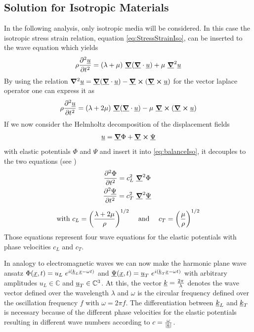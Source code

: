 
\subsection{Solution for Isotropic Materials}
\label{sec:IsoSolution}
In the following analysis, only isotropic media will be considered. In this
case the isotropic stress strain relation, equation
\ref{eq:StressStrainIso}, can be inserted to the wave equation which
yields
\begin{equation}
    \rho \ddiff{\uline{u}}{t} = (\lambda + \mu)\ \uline{\gradient}
    (\uline{\gradient}\cdot \uline{u}) + \mu\ \uline{\gradient}^2 \uline{u}
\end{equation}
By using the relation $\gradient^2 \uline u = \uline{\gradient}
    (\uline{\gradient}\cdot \uline{u}) - \uline{\gradient}
    \cross(\uline{\gradient} \cross \uline{u})$ for the vector laplace operator
one can express it as
\begin{equation} \label{eq:balanceIso}
    \rho \ddiff{\uline{u}}{t} = (\lambda + 2\mu)\ \uline{\gradient}
    (\uline{\gradient}\cdot \uline{u})- \mu\ \uline{\grad }
    \cross (\uline{\gradient}\cross \uline{u})
\end{equation}
If we now consider the Helmholtz decomposition of the displacement fields
\begin{equation} \label{eq:Helmholtz}
    \uline{u} = \uline{\gradient}\Phi + \uline{\gradient}\cross \uline{\Psi}
\end{equation}
with elastic potentials $\Phi$ and $\Psi$ and insert it into
\ref{eq:balanceIso},
it decouples to the two equations (see \cite{BedfordElasticWaves})
\begin{align}
    \ddiff{\Phi}{t} = c_L^2\
     & \uline{\gradient}^2\Phi         \\
    \ddiff{\uline{\Psi}}{t} = c_T^2\
     & \uline{\gradient}^2\uline{\Psi} \\[5pt]
    \text{with } c_L = \left(\frac{\lambda + 2\mu}{\rho}\right)^{1/2} \quad
     &
    \text{ and } \quad c_T = \left(\frac{\mu}{\rho}\right)^{1/2}
    \label{eq:veldef}
\end{align}
Those equations represent four wave equations for the elastic potentials with
phase velocities $c_L$ and $c_T$.

In analogy to electromagnetic waves we can now make the harmonic
plane wave ansatz $\Phi(\underline{x}, t)= u_L\
    e^{i(\underline{k}_L \underline{x}-\omega t)}$ and $\underline{\Psi}(\underline{x}, t)
    =
    \underline{u}_T \ e^{i(\underline{k}_T\underline{x}-\omega t)}$ with arbitrary
amplitudes $u_L\in\mathbb{C}$ and $\underline{u}_T\in \mathbb{C}^3$.
At this, the vector
$\underline{k}=\frac{2\pi}{\lambda}$ denotes the wave vector defined over the
wavelength $\lambda$ and $\omega$ is the circular frequency defined over the
oscillation frequency $f$ with	$\omega = 2 \pi f$. The differentiation between
$\underline{k}_L$ and $\underline{k}_T$ is necessary because of the different
phase velocities for the elastic potentials resulting in different wave numbers
according to $c = \frac{\omega}{|\underline{k}|}$.

